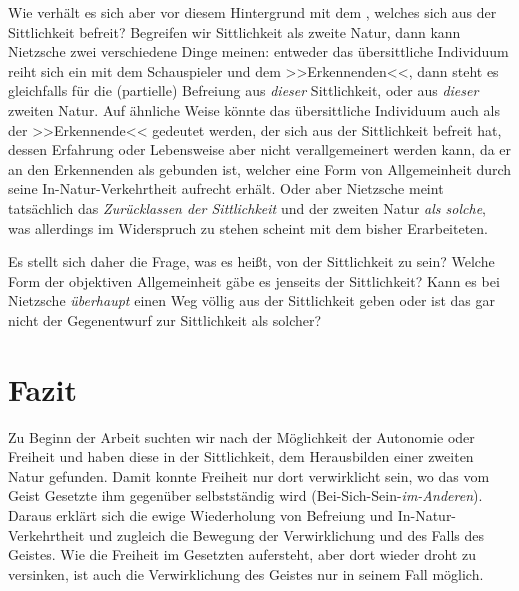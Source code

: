 \documentclass[12pt, a4paper, openany]{report}
\begin{document}
Wie verhält es sich aber vor diesem Hintergrund mit dem , welches sich aus der Sittlichkeit befreit? 
Begreifen wir Sittlichkeit als zweite Natur, dann kann Nietzsche zwei verschiedene Dinge meinen: 
entweder das übersittliche Individuum reiht sich ein mit dem Schauspieler und dem >>Erkennenden<<, dann steht es gleichfalls für die (partielle) Befreiung aus \emph{dieser} Sittlichkeit, oder aus \emph{dieser} zweiten Natur. 
Auf ähnliche Weise könnte das übersittliche Individuum auch als der >>Erkennende<< gedeutet werden, der sich aus der Sittlichkeit befreit hat, dessen Erfahrung oder Lebensweise aber nicht verallgemeinert werden kann, da er an den Erkennenden als  gebunden ist, welcher eine Form von Allgemeinheit durch seine In-Natur-Verkehrtheit aufrecht erhält.
Oder aber Nietzsche meint tatsächlich das \emph{Zurücklassen der Sittlichkeit} und der zweiten Natur \emph{als solche}, was allerdings im Widerspruch zu stehen scheint mit dem bisher Erarbeiteten.

Es stellt sich daher die Frage, was es heißt, von der Sittlichkeit  zu sein? 
Welche Form der objektiven Allgemeinheit gäbe es jenseits der Sittlichkeit?
Kann es bei Nietzsche \emph{überhaupt} einen Weg völlig aus der Sittlichkeit geben oder ist das  gar nicht der Gegenentwurf zur Sittlichkeit als solcher? 


\chapter{Fazit}
Zu Beginn der Arbeit suchten wir nach der Möglichkeit der Autonomie oder Freiheit und haben diese in der Sittlichkeit, dem Herausbilden einer zweiten Natur gefunden.
Damit konnte Freiheit nur dort verwirklicht sein, wo das vom Geist Gesetzte ihm gegenüber selbstständig wird (Bei-Sich-Sein-\emph{im-Anderen}).
Daraus erklärt sich die ewige Wiederholung von Befreiung und In-Natur-Verkehrtheit und zugleich die Bewegung der Verwirklichung und des Falls des Geistes. 
Wie die Freiheit im Gesetzten aufersteht, aber dort wieder droht zu versinken, ist auch die Verwirklichung des Geistes nur in seinem Fall möglich.
\end{document}

